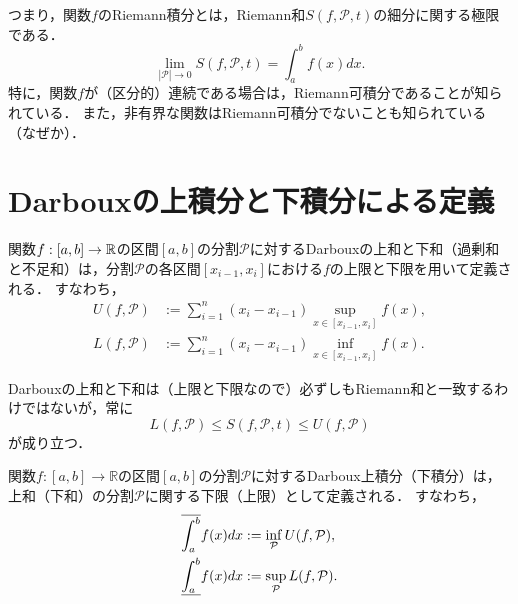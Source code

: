 つまり，関数$f$のRiemann積分とは，Riemann和$S(f,\mathcal{P},t)$の細分に関する極限である．
\[
\lim_{|\mathcal{P}|\to 0} S(f,\mathcal{P},t) = \int_a^b f(x) dx.
\]
特に，関数$f$が（区分的）連続である場合は，Riemann可積分であることが知られている．
また，非有界な関数はRiemann可積分でないことも知られている（なぜか）．

\section{Darbouxの上積分と下積分による定義}


\begin{definition}[Darbouxの上和と下和]
    関数$f : [a,b] \to \mathbb R$の区間$[a,b]$の分割$\mathcal{P}$に対するDarbouxの上和と下和（過剰和と不足和）は，分割$\mathcal{P}$の各区間$[x_{i-1}, x_i]$における$f$の上限と下限を用いて定義される．
    すなわち，
    \begin{align*}
        U(f,\mathcal{P}) &:= \sum_{i=1}^n (x_i - x_{i-1}) \sup_{x \in [x_{i-1}, x_i]} f(x), \\
        L(f,\mathcal{P}) &:= \sum_{i=1}^n (x_i - x_{i-1}) \inf_{x \in [x_{i-1}, x_i]} f(x).
    \end{align*}
\end{definition}

Darbouxの上和と下和は（上限と下限なので）必ずしもRiemann和と一致するわけではないが，常に
\[
L(f,\mathcal{P}) \leq S(f,\mathcal{P},t) \leq U(f,\mathcal{P})
\]
が成り立つ．

\begin{definition}[Darbouxの上積分と下積分]
    関数$f : [a,b] \to \mathbb{R}$の区間$[a,b]$の分割$\mathcal{P}$に対するDarboux上積分（下積分）は，上和（下和）の分割$\mathcal{P}$に関する下限（上限）として定義される．
    すなわち，
    \begin{align*}
        \overline{\int_{a}^{b}} f(x) dx &:= \inf_{\mathcal{P}} U(f,\mathcal{P}), \\
        \underline{\int_{a}^{b}} f(x) dx &:= \sup_{\mathcal{P}} L(f,\mathcal{P}).
    \end{align*}
\end{definition}

